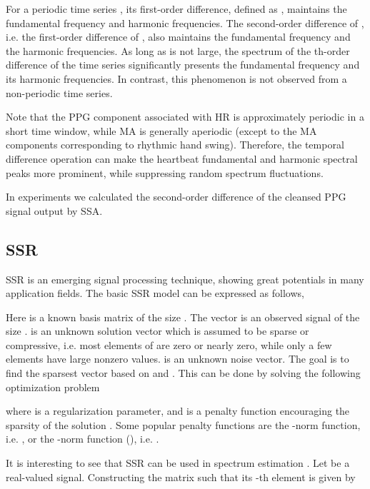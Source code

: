 \documentclass[10pt,twocolumn]{IEEEtran}
\begin{document}
For a periodic time series , its first-order difference, defined as , maintains the fundamental frequency and harmonic frequencies. The second-order difference of , i.e. the first-order difference of , also maintains the fundamental frequency and the harmonic frequencies. As long as  is not large, the spectrum of the th-order difference of the time series  significantly presents the fundamental frequency and its harmonic frequencies. In contrast, this phenomenon is not observed from a non-periodic time series.


Note that the PPG component associated with HR is approximately periodic in a short time window, while MA is generally aperiodic (except to the MA components corresponding to rhythmic hand swing). Therefore, the temporal difference operation can make the heartbeat fundamental and harmonic spectral peaks more prominent, while suppressing random spectrum fluctuations.

In experiments we calculated the second-order difference of the cleansed PPG signal output by SSA.





\subsection{SSR}

SSR \cite{Gorodnitsky1997,cotter2005sparse,Donoho2006compressed,Eladbook} is an emerging signal processing technique, showing great potentials in many application fields. The basic SSR model can be expressed as follows,

Here  is a known basis matrix of the size . The vector  is an observed signal of the size .   is an unknown solution vector which is assumed to be sparse or compressive, i.e. most elements of   are zero or nearly zero, while only a few elements have large nonzero values.  is an unknown noise vector. The goal is to find the sparsest vector  based on  and . This can be done by solving the following optimization problem

where  is a regularization parameter, and  is a penalty function encouraging the sparsity of the solution . Some popular penalty functions are the -norm function, i.e.  \cite{lasso}, or the -norm function (), i.e.  \cite{Gorodnitsky1997}.

It is interesting to see that SSR can be used in spectrum estimation \cite{Gorodnitsky1997,duarte2013spectral}. Let  be a real-valued signal. Constructing the matrix  such that its -th element  is given by
\end{document}
